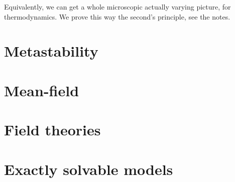 \documentclass[a4paper]{book}
\theoremstyle{definition}
\theoremstyle{remark}
\begin{document}
Equivalently, we can get a whole microscopic actually varying picture, for thermodynamics. We prove this way the second's principle, see the notes. 
\chapter{Metastability}

\chapter{Mean-field}

\chapter{Field theories}

\chapter{Exactly solvable models}
\end{document}

